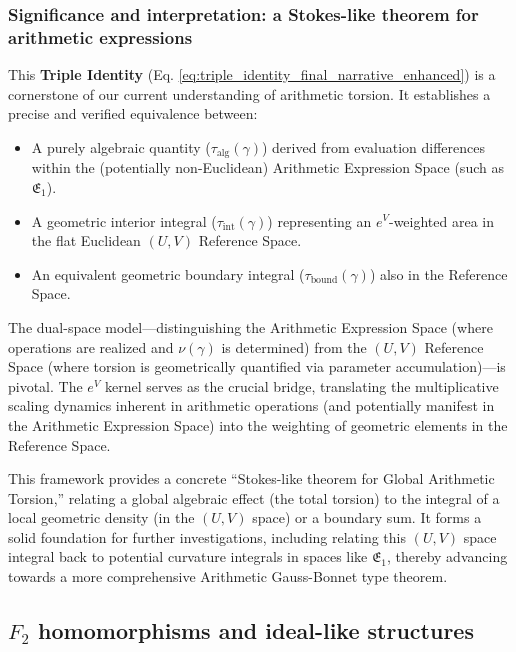 \subsubsection*{Significance and interpretation: a Stokes-like theorem for arithmetic expressions}

This \textbf{Triple Identity} (Eq. \ref{eq:triple_identity_final_narrative_enhanced}) is a cornerstone of our current understanding of arithmetic torsion. It establishes a precise and verified equivalence between:
\begin{itemize}
    \item A purely algebraic quantity ($\tau_{\text{alg}}(\gamma)$) derived from evaluation differences within the (potentially non-Euclidean) Arithmetic Expression Space (such as $\mathfrak{E}_1$).
    \item A geometric interior integral ($\tau_{\text{int}}(\gamma)$) representing an $e^V$-weighted area in the flat Euclidean $(U,V)$ Reference Space.
    \item An equivalent geometric boundary integral ($\tau_{\text{bound}}(\gamma)$) also in the Reference Space.
\end{itemize}
The dual-space model---distinguishing the Arithmetic Expression Space (where operations are realized and $\nu(\gamma)$ is determined) from the $(U,V)$ Reference Space (where torsion is geometrically quantified via parameter accumulation)---is pivotal. The $e^V$ kernel serves as the crucial bridge, translating the multiplicative scaling dynamics inherent in arithmetic operations (and potentially manifest in the Arithmetic Expression Space) into the weighting of geometric elements in the Reference Space.

This framework provides a concrete ``Stokes-like theorem for Global Arithmetic Torsion,'' relating a global algebraic effect (the total torsion) to the integral of a local geometric density (in the $(U,V)$ space) or a boundary sum. It forms a solid foundation for further investigations, including relating this $(U,V)$ space integral back to potential curvature integrals in spaces like $\mathfrak{E}_1$, thereby advancing towards a more comprehensive Arithmetic Gauss-Bonnet type theorem.

\subsection{$F_2$ homomorphisms and ideal-like structures}
\label{sec:uv_space_algebraic_significance}

